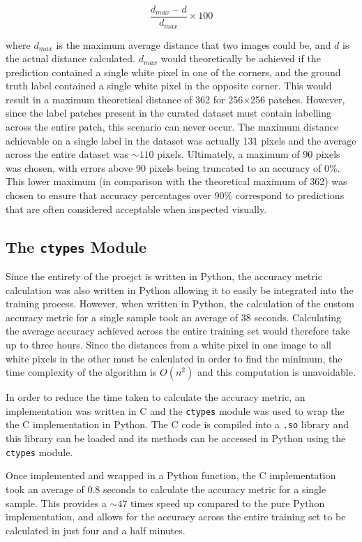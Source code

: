 \begin{equation*}
    \frac{d_{max} - {d}}{d_{max}} \times 100
\end{equation*}

where $d_{max}$ is the maximum average distance that two images could be, and $d$ is the actual distance calculated. $d_{max}$ would theoretically be achieved if the prediction contained a single white pixel in one of the corners, and the ground truth label contained a single white pixel in the opposite corner. This would result in a maximum theoretical distance of 362 for 256$\times$256 patches. However, since the label patches present in the curated dataset must contain labelling across the entire patch, this scenario can never occur. The maximum distance achievable on a single label in the dataset was actually 131 pixels and the average across the entire dataset was ${\sim}110$ pixels. Ultimately, a maximum of 90 pixels was chosen, with errors above 90 pixels being truncated to an accuracy of 0\%. This lower maximum (in comparison with the theoretical maximum of 362) was chosen to ensure that accuracy percentages over 90\% correspond to predictions that are often considered acceptable when inspected visually.

\subsection{The \texttt{ctypes} Module}

Since the entirety of the proejct is written in Python, the accuracy metric calculation was also written in Python allowing it to easily be integrated into the training process. However, when written in Python, the calculation of the custom accuracy metric for a single sample took an average of 38 seconds. Calculating the average accuracy achieved across the entire training set would therefore take up to three hours. Since the distances from a white pixel in one image to all white pixels in the other must be calculated in order to find the minimum, the time complexity of the algorithm is $O(n^2)$ and this computation is unavoidable.

In order to reduce the time taken to calculate the accuracy metric, an implementation was written in C and the \texttt{ctypes} module was used to wrap the the C implementation in Python. The C code is compiled into a \texttt{.so} library and this library can be loaded and its methods can be accessed in Python using the \texttt{ctypes} module. 

Once implemented and wrapped in a Python function, the C implementation took an average of 0.8 seconds to calculate the accuracy metric for a single sample. This provides a ${\sim}47$ times speed up compared to the pure Python implementation, and allows for the accuracy across the entire training set to be calculated in just four and a half minutes.

